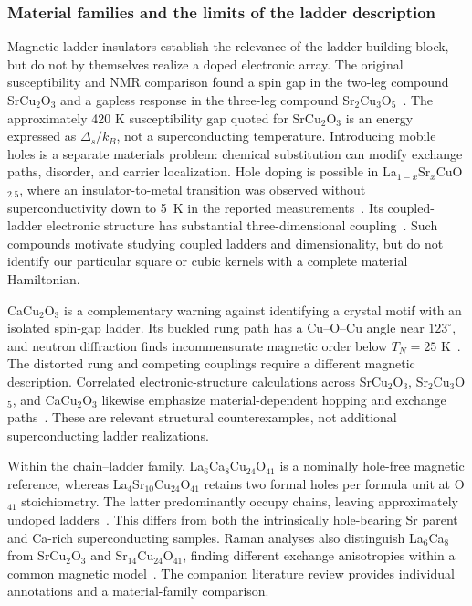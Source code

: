 \documentclass[11pt,letterpaper]{article}
\begin{document}
\subsubsection*{Material families and the limits of the ladder description}
Magnetic ladder insulators establish the relevance of the ladder building
block, but do not by themselves realize a doped electronic array.
The original susceptibility and NMR comparison found a spin gap in the
two-leg compound SrCu$_2$O$_3$ and a gapless response in the three-leg
compound Sr$_2$Cu$_3$O$_5$~\citep{Azuma1994}.
The approximately 420 K susceptibility gap quoted for SrCu$_2$O$_3$ is an
energy expressed as $\Delta_s/k_B$, not a superconducting temperature.
Introducing mobile holes is a separate materials problem: chemical
substitution can modify exchange paths, disorder, and carrier localization.
Hole doping is possible in La$_{1-x}$Sr$_x$CuO$_{2.5}$, where an
insulator-to-metal transition was observed without superconductivity down
to 5~K in the reported measurements~\citep{Hiroi1995}.
Its coupled-ladder electronic structure has substantial three-dimensional
coupling~\citep{NormandRice1996}. Such compounds motivate studying coupled
ladders and dimensionality, but do not identify our particular square or
cubic kernels with a complete material Hamiltonian.

CaCu$_2$O$_3$ is a complementary warning against identifying a crystal motif
with an isolated spin-gap ladder. Its buckled rung path has a Cu--O--Cu angle
near $123^\circ$, and neutron diffraction finds incommensurate magnetic
order below $T_N=25$ K~\citep{Kiryukhin2001}. The distorted rung and competing
couplings require a different magnetic description. Correlated
electronic-structure calculations across SrCu$_2$O$_3$, Sr$_2$Cu$_3$O$_5$,
and CaCu$_2$O$_3$ likewise emphasize material-dependent hopping and exchange
paths~\citep{Bordas2006}. These are relevant structural counterexamples, not
additional superconducting ladder realizations.

Within the chain--ladder family, La$_6$Ca$_8$Cu$_{24}$O$_{41}$ is a
nominally hole-free magnetic reference, whereas La$_4$Sr$_{10}$Cu$_{24}$O$_{41}$
retains two formal holes per formula unit at O$_{41}$ stoichiometry.
The latter predominantly occupy chains, leaving approximately undoped
ladders~\citep{Nucker2000,Notbohm2007}. This differs from both the intrinsically
hole-bearing Sr parent and Ca-rich superconducting samples. Raman analyses
also distinguish La$_6$Ca$_8$ from SrCu$_2$O$_3$ and Sr$_{14}$Cu$_{24}$O$_{41}$,
finding different exchange anisotropies within a common magnetic
model~\citep{Schmidt2005}. The companion literature review provides
individual annotations and a material-family comparison.
\end{document}
